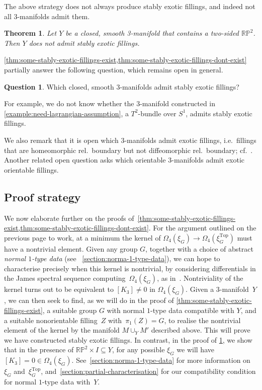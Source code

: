 \documentclass[a4paper, reqno]{amsart}
\newtheorem{theorem}[proposition]{Theorem}
\theoremstyle{definition}
\newtheorem{question}[proposition]{Question}
\theoremstyle{remark}
\newcommand{\RP}{\mathbb{RP}}
\newcommand{\Top}{\mathrm{Top}}
\begin{document}
The above strategy does not always produce stably exotic fillings, and indeed not all 3-manifolds admit them. 

\begin{theorem}\label{thm:some-stably-exotic-fillings-dont-exist}
   Let $Y$ be a closed, smooth 3-manifold that contains a two-sided $\RP^2$. Then $Y$ does not admit stably exotic fillings. 
\end{theorem}

\cref{thm:some-stably-exotic-fillings-exist,thm:some-stably-exotic-fillings-dont-exist} partially answer the following question, which remains open in general. 

\begin{question}\label{question:main}
Which closed, smooth 3-manifolds admit stably exotic fillings?
\end{question}

For example, we do not know whether the 3-manifold constructed in \cref{example:need-lagrangian-assumption}, a $T^2$-bundle over $S^1$, admits stably exotic fillings. 

We also remark that it is open which 3-manifolds admit exotic fillings, i.e.~fillings that are homeomorphic rel.\ boundary but not diffeomorphic rel.\ boundary; cf.~. Another related open question asks which orientable 3-manifolds admit exotic orientable fillings.

\subsection*{Proof strategy}
We now elaborate further on the proofs of~\cref{thm:some-stably-exotic-fillings-exist,thm:some-stably-exotic-fillings-dont-exist}. For the argument outlined on the previous page to work, at a minimum the kernel 
of $\Omega_4(\xi_G) \to \Omega_4(\xi^{\Top}_G)$ must have a nontrivial element. Given any group $G$, together with a choice of abstract \emph{normal $1$-type data} (see ~\cref{section:norma-1-type-data}), we can hope to characterise precisely when this kernel is nontrivial, by considering differentials in the James spectral sequence computing~$\Omega_4(\xi_G)$, as in~\cite{Kasprowski-Powell}. Nontriviality of the kernel turns out to be equivalent to $[K_3] \neq 0$ in $\Omega_4(\xi_G)$. Given a $3$-manifold~$Y$, we can then seek to find, as we will do in the proof of \cref{thm:some-stably-exotic-fillings-exist}, a suitable group $G$ with normal $1$-type data compatible with $Y$, and a suitable nonorientable filling~$Z$ with~$\pi_1(Z)=G$, to realise the nontrivial element of the kernel by the manifold $M\cup_Y M'$ described above. This will prove we have constructed stably exotic fillings. In contrast, in the proof of \cref{thm:some-stably-exotic-fillings-dont-exist}, we show that in the presence of $\RP^2 \times I \subseteq Y$, for any possible $\xi_G$ we will have $[K_3]=0 \in \Omega_4(\xi_G)$.
See~\cref{section:norma-1-type-data} for more information on~$\xi_G$ and~$\xi_G^\Top$, and~\cref{section:partial-characterisation} for our compatibility condition for normal $1$-type data with~$Y$.
\end{document}
